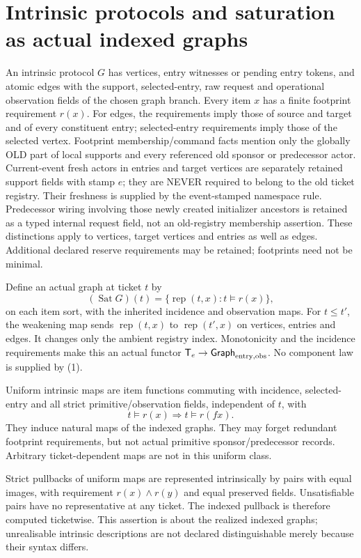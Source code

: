 \documentclass[11pt]{article}
\begin{document}
\section{Intrinsic protocols and saturation as actual indexed graphs}
An intrinsic protocol $G$ has vertices, entry witnesses or pending entry tokens, and atomic edges with the support, selected-entry, raw request and operational observation fields of the chosen graph branch. Every item $x$ has a finite footprint requirement $r(x)$. For edges, the requirements imply those of source and target and of every constituent entry; selected-entry requirements imply those of the selected vertex. Footprint membership/command facts mention only the globally OLD part of local supports and every referenced old sponsor or predecessor actor. Current-event fresh actors in entries and target vertices are separately retained support fields with stamp $e$; they are NEVER required to belong to the old ticket registry. Their freshness is supplied by the event-stamped namespace rule. Predecessor wiring involving those newly created initializer ancestors is retained as a typed internal request field, not an old-registry membership assertion. These distinctions apply to vertices, target vertices and entries as well as edges. Additional declared reserve requirements may be retained; footprints need not be minimal.

Define an actual graph at ticket $t$ by
\[
       (\operatorname{Sat}G)(t)=\{\operatorname{rep}(t,x):
                                             t\models r(x)\}, \tag{1}
\]
on each item sort, with the inherited incidence and observation maps. For $t\leq t'$, the weakening map sends $\operatorname{rep}(t,x)$ to $\operatorname{rep}(t',x)$ on vertices, entries and edges. It changes only the ambient registry index. Monotonicity and the incidence requirements make this an actual functor $\mathsf T_e\to\mathsf{Graph}_{\rm entry,obs}$. No component law is supplied by (1).

Uniform intrinsic maps are item functions commuting with incidence, selected-entry and all strict primitive/observation fields, independent of $t$, with
\[
       t\models r(x)\Longrightarrow t\models r(fx).       \tag{2}
\]
They induce natural maps of the indexed graphs. They may forget redundant footprint requirements, but not actual primitive sponsor/predecessor records. Arbitrary ticket-dependent maps are not in this uniform class.

Strict pullbacks of uniform maps are represented intrinsically by pairs with equal images, with requirement $r(x)\wedge r(y)$ and equal preserved fields. Unsatisfiable pairs have no representative at any ticket. The indexed pullback is therefore computed ticketwise. This assertion is about the realized indexed graphs; unrealisable intrinsic descriptions are not declared distinguishable merely because their syntax differs.
\end{document}
